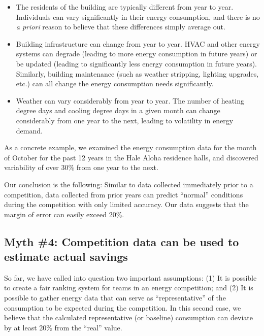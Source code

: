 \documentclass[jou]{apa} %
\begin{document}
\begin{itemize}

\item The residents of the building are typically different from year to year.
  Individuals can vary significantly in their energy consumption, and there is no {\em a
    priori} reason to believe that these differences simply average out. 

\item Building infrastructure can change from year to year. HVAC and other energy systems
  can degrade (leading to more energy consumption in future years) or be updated (leading
  to significantly less energy consumption in future years).  Similarly, building
  maintenance (such as weather stripping, lighting upgrades, etc.) can all change the
  energy consumption needs significantly.

\item Weather can vary considerably from year to year.  The number of heating degree days and cooling
  degree days in a given month can change considerably from one year to the next, leading
  to volatility in energy demand. 

\end{itemize}

As a concrete example, we examined the energy consumption data for the month of October
for the past 12 years in the Hale Aloha residence halls, and discovered variability of
over 30\% from one year to the next.

Our conclusion is the following: Similar to data collected immediately prior to a
competition, data collected from prior years can predict ``normal'' conditions during the
competition with only limited accuracy.  Our data suggests that the margin of error can easily
exceed 20\%.


\subsection{Myth \#4: Competition data can be used to estimate actual savings}

So far, we have called into question two important assumptions: (1) It is possible to
create a fair ranking system for teams in an energy competition; and (2) It is possible to
gather energy data that can serve as ``representative'' of the consumption to be expected
during the competition.  In this second case, we believe that the calculated
representative (or baseline) consumption can deviate by at least 20\% from the ``real''
value.
\end{document}

